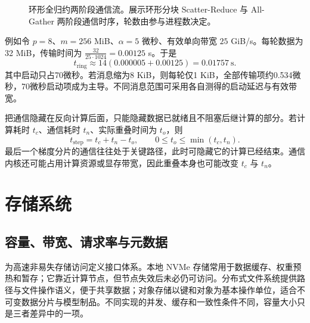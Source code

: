 \documentclass[../textbook.tex]{subfiles}
\begin{document}
\begin{figure}[htbp]
\centering
{}
\caption[环形全归约两阶段通信流]{环形全归约两阶段通信流。展示环形分块 Scatter-Reduce 与 All-Gather 两阶段通信时序，轮数由参与进程数决定。}\label{fig:infra-collective}
\end{figure}

例如令 $p=8$、$m=256$ MiB、$\alpha=5$ 微秒、有效单向带宽 $25$ GiB/s。每轮数据为32 MiB，传输时间为 $\frac{32}{25\cdot1024}=0.00125$ s。于是
\begin{equation}
 t_{\mathrm{ring}}\approx14(0.000005+0.00125)
 =0.01757\ \mathrm{s}.
\end{equation}
其中启动只占70微秒。若消息缩为8 KiB，则每轮仅1 KiB，全部传输项约0.534微秒，70微秒启动项成为主导。不同消息范围可采用各自测得的启动延迟与有效带宽。

把通信隐藏在反向计算后面，只能隐藏数据已就绪且不阻塞后继计算的部分。若计算耗时 $t_c$、通信耗时 $t_n$、实际重叠时间为 $t_o$，则
\begin{equation}
 t_{\mathrm{step}}=t_c+t_n-t_o,\qquad
 0\leq t_o\leq\min(t_c,t_n).
\end{equation}
最后一个梯度分片的通信往往处于关键路径，此时可隐藏它的计算已经结束。通信内核还可能占用计算资源或显存带宽，因此重叠本身也可能改变 $t_c$ 与 $t_n$。

\section{存储系统}

\subsection{容量、带宽、请求率与元数据}
为高速非易失存储访问定义接口体系。\cite{nvmexpress2026specifications}本地 NVMe 存储常用于数据缓存、权重预热和暂存；它靠近计算节点，但节点失效后未必仍可访问。分布式文件系统提供路径与文件操作语义，便于共享数据；对象存储以键和对象为基本操作单位，适合不可变数据分片与模型制品。不同实现的并发、缓存和一致性条件不同，容量大小只是三者差异中的一项。
\end{document}
